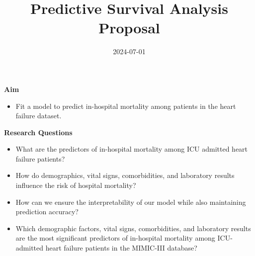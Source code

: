 \documentclass[
]{article}
\title{Predictive Survival Analysis Proposal}
\author{}
\date{\vspace{-2.5em}2024-07-01}
\providecommand{\tightlist}{%
  \setlength{\itemsep}{0pt}\setlength{\parskip}{0pt}}
\begin{document}
\maketitle

\textbf{Aim}

\begin{itemize}
\tightlist
\item
  Fit a model to predict in-hospital mortality among patients in the
  heart failure dataset.
\end{itemize}

\textbf{Research Questions}

\begin{itemize}
\item
  What are the predictors of in-hospital mortality among ICU admitted
  heart failure patients?
\item
  How do demographics, vital signs, comorbidities, and laboratory
  results influence the risk of hospital mortality?
\item
  How can we ensure the interpretability of our model while also
  maintaining prediction accuracy?
\item
  Which demographic factors, vital signs, comorbidities, and laboratory
  results are the most significant predictors of in-hospital mortality
  among ICU-admitted heart failure patients in the MIMIC-III database?
\end{itemize}

\newpage
\end{document}
